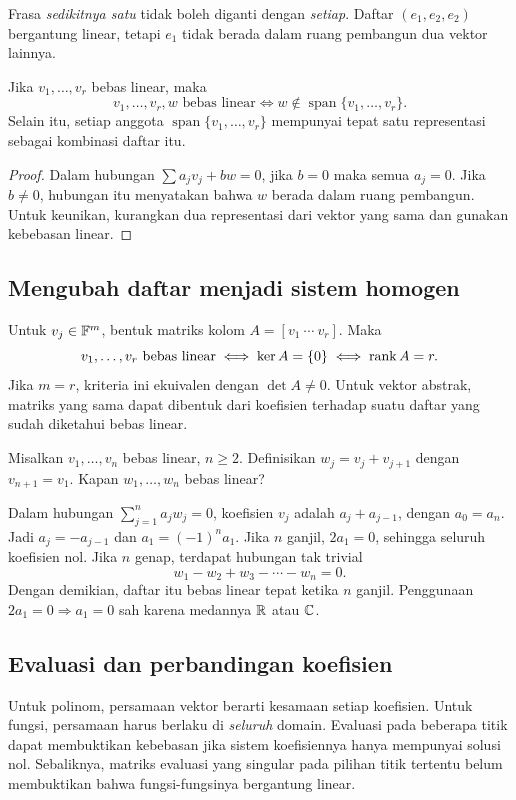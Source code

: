 Frasa \emph{sedikitnya satu} tidak boleh diganti dengan
\emph{setiap}. Daftar $(e_1,e_2,e_2)$ bergantung linear, tetapi
$e_1$ tidak berada dalam ruang pembangun dua vektor lainnya.

\begin{prop}
    Jika $v_1,\ldots,v_r$ bebas linear, maka
    \[
        v_1,\ldots,v_r,w\text{ bebas linear}
        \iff w\notin\operatorname{span}\{v_1,\ldots,v_r\}.
    \]
    Selain itu, setiap anggota $\operatorname{span}\{v_1,\ldots,v_r\}$
    mempunyai tepat satu representasi sebagai kombinasi daftar itu.
\end{prop}
\begin{proof}
    Dalam hubungan $\sum a_jv_j+bw=0$, jika $b=0$ maka semua
    $a_j=0$. Jika $b\ne0$, hubungan itu menyatakan bahwa $w$
    berada dalam ruang pembangun. Untuk keunikan, kurangkan
    dua representasi dari vektor yang sama dan gunakan kebebasan linear.
\end{proof}

\subsection{Mengubah daftar menjadi sistem homogen}
Untuk $v_j\in\mathbb{F}^m$, bentuk matriks kolom
$A=[v_1\ \cdots\ v_r]$. Maka
\[
    v_1,\ldots,v_r\text{ bebas linear}
    \iff\ker A=\{0\}\iff\operatorname{rank} A=r.
\]
Jika $m=r$, kriteria ini ekuivalen dengan $\det A\ne0$.
Untuk vektor abstrak, matriks yang sama dapat dibentuk dari
koefisien terhadap suatu daftar yang sudah diketahui bebas linear.

\begin{exam}
    Misalkan $v_1,\ldots,v_n$ bebas linear, $n\ge2$.
    Definisikan $w_j=v_j+v_{j+1}$ dengan $v_{n+1}=v_1$.
    Kapan $w_1,\ldots,w_n$ bebas linear?
\end{exam}
\begin{solution}
    Dalam hubungan $\sum_{j=1}^n a_jw_j=0$, koefisien $v_j$
    adalah $a_j+a_{j-1}$, dengan $a_0=a_n$.
    Jadi $a_j=-a_{j-1}$ dan $a_1=(-1)^na_1$.
    Jika $n$ ganjil, $2a_1=0$, sehingga seluruh koefisien nol.
    Jika $n$ genap, terdapat hubungan tak trivial
    \[
        w_1-w_2+w_3-\cdots-w_n=0.
    \]
    Dengan demikian, daftar itu bebas linear tepat ketika $n$ ganjil.
    Penggunaan $2a_1=0\Rightarrow a_1=0$ sah karena medannya
    $\mathbb{R}$ atau $\mathbb{C}$.
\end{solution}

\subsection{Evaluasi dan perbandingan koefisien}
Untuk polinom, persamaan vektor berarti kesamaan setiap koefisien.
Untuk fungsi, persamaan harus berlaku di \emph{seluruh} domain.
Evaluasi pada beberapa titik dapat membuktikan kebebasan jika
sistem koefisiennya hanya mempunyai solusi nol. Sebaliknya,
matriks evaluasi yang singular pada pilihan titik tertentu
belum membuktikan bahwa fungsi-fungsinya bergantung linear.

